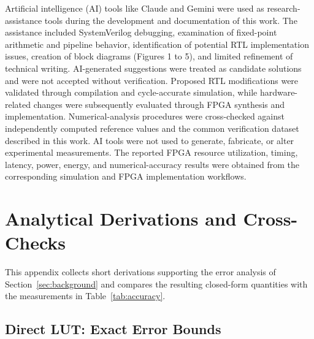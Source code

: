 \documentclass[manuscript,screen,review]{acmart}
\begin{document}
\begin{acks}
Artificial intelligence (AI) tools like Claude and Gemini were used as research-assistance tools during the development and documentation of this work. The assistance included SystemVerilog debugging, examination of fixed-point arithmetic and pipeline behavior, identification of potential RTL implementation issues, creation of block diagrams (Figures 1 to 5), and limited refinement of technical writing. AI-generated suggestions were treated as candidate solutions and were not accepted without verification. Proposed RTL modifications were validated through compilation and cycle-accurate simulation, while hardware-related changes were subsequently evaluated through FPGA synthesis and implementation. Numerical-analysis procedures were cross-checked against independently computed reference values and the common verification dataset described in this work. AI tools were not used to generate, fabricate, or alter experimental measurements. The reported FPGA resource utilization, timing, latency, power, energy, and numerical-accuracy results were obtained from the corresponding simulation and FPGA implementation workflows. 
\end{acks}




\appendix
 
\section{Analytical Derivations and Cross-Checks}
\label{app:derivations}
 
This appendix collects short derivations supporting the error analysis of Section~\ref{sec:background} and compares the resulting closed-form quantities with the measurements in Table~\ref{tab:accuracy}.
 
\subsection{Direct LUT: Exact Error Bounds}
\label{app:directlut}
 
\end{document}
